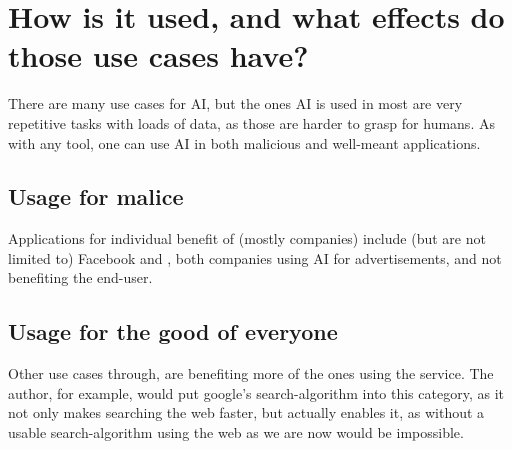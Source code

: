 \chapter{How is it used, and what effects do those use cases have?}




There are many use cases for AI, but the ones AI is used in most are very repetitive tasks with loads of data, as those are harder to grasp for humans. As with any tool, one can use AI in both malicious and well-meant applications.
\section{Usage for malice}
Applications for individual benefit of (mostly companies) include (but are not limited to) Facebook \cite{facebookWerbungAufInstagram} and \cite{googleOnlinewerbungLeichtGemacht}, both companies using AI for advertisements, and not benefiting the end-user.
\section{Usage for the good of everyone}
Other use cases through, are benefiting more of the ones using the service. The author, for example, would put google's search-algorithm \cite{googleFunktioniertGoogleSucheSuchalgorithmen} into this category, as it not only makes searching the web faster, but actually enables it, as without a usable search-algorithm using the web as we are now would be impossible.
